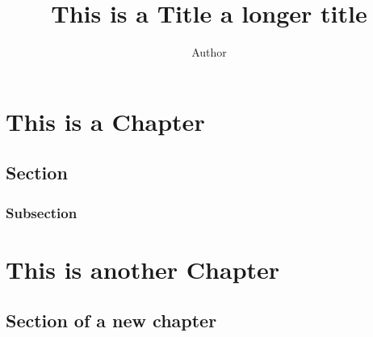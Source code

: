 \documentclass{pkStudyNotes}
\title{This is a Title  a longer title}
\author{Author}
\begin{document}
    \createtitle  
    \chapter{This is a Chapter}
    \section{Section}
    \lipsum[3]
    \subsection{Subsection}
    \lipsum[2]
    \chapter{This is another Chapter}
    \section{Section of a new chapter}
    \lipsum[2-5]

    
    
\end{document}
